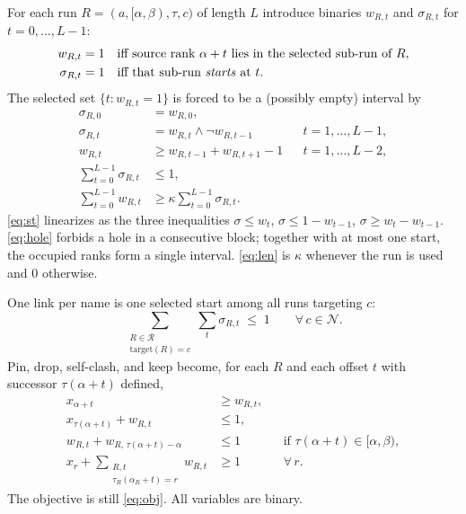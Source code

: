 \documentclass[11pt,a4paper]{article}
\theoremstyle{definition}
\theoremstyle{plain}
\theoremstyle{remark}
\newcommand{\Names}{\mathcal{N}}
\newcommand{\Runs}{\mathcal{R}}
\begin{document}
For each run $R = (a,[\alpha,\beta), \tau, c)$ of length $L$ introduce
binaries $w_{R,t}$ and $\sigma_{R,t}$ for $t = 0,\dots,L-1$:
\begin{align*}
  w_{R,t} &= 1 &&\text{iff source rank $\alpha+t$ lies in the selected
                 sub-run of $R$,} \\
  \sigma_{R,t} &= 1 &&\text{iff that sub-run \emph{starts} at $t$.}
\end{align*}
The selected set $\{ t : w_{R,t} = 1 \}$ is forced to be a (possibly
empty) interval by
\begin{align}
  \sigma_{R,0} &= w_{R,0},
    \label{eq:st0} \\
  \sigma_{R,t} &= w_{R,t} \land \lnot w_{R,t-1}
    && t = 1,\dots,L-1,
    \label{eq:st} \\
  w_{R,t} &\ge w_{R,t-1} + w_{R,t+1} - 1
    && t = 1,\dots,L-2,
    \label{eq:hole} \\
  \sum_{t=0}^{L-1} \sigma_{R,t} &\le 1,
    \label{eq:onestart} \\
  \sum_{t=0}^{L-1} w_{R,t}
    &\ge \kappa \sum_{t=0}^{L-1} \sigma_{R,t}.
    \label{eq:len}
\end{align}
\eqref{eq:st} linearizes as the three inequalities
$\sigma \le w_t$, $\sigma \le 1 - w_{t-1}$,
$\sigma \ge w_t - w_{t-1}$. \eqref{eq:hole} forbids a hole in a
consecutive block; together with at most one start, the occupied ranks
form a single interval. \eqref{eq:len} is $\kappa$ whenever the run is
used and $0$ otherwise.

One link per name is one selected start among all runs targeting $c$:
\begin{equation}
  \sum_{\substack{R \in \Runs \\ \mathrm{target}(R)=c}}
    \sum_{t} \sigma_{R,t}
  \;\le\; 1
  \qquad \forall\, c \in \Names.
  \tag{F1$'$} \label{eq:F1c}
\end{equation}
Pin, drop, self-clash, and keep become, for each $R$ and each offset
$t$ with successor $\tau(\alpha+t)$ defined,
\begin{align}
  x_{\alpha+t} &\ge w_{R,t},
    \tag{pin$'$} \label{eq:pinc} \\
  x_{\tau(\alpha+t)} + w_{R,t} &\le 1,
    \tag{drop$'$} \label{eq:dropc} \\
  w_{R,t} + w_{R,\, \tau(\alpha+t)-\alpha} &\le 1
    && \text{if } \tau(\alpha+t) \in [\alpha,\beta),
    \tag{clash} \label{eq:clash} \\
  x_r + \sum_{\substack{R,t \\ \tau_R(\alpha_R+t)=r}} w_{R,t}
    &\ge 1
    && \forall\, r.
    \tag{keep$'$} \label{eq:keepc}
\end{align}
The objective is still \eqref{eq:obj}. All variables are binary.
\end{document}
